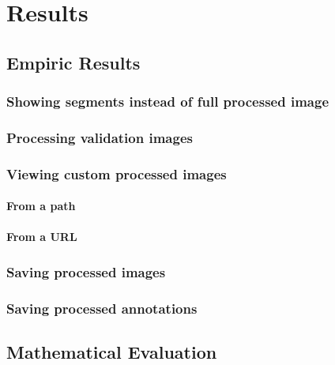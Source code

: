 \chapter{Results}

\section{Empiric Results}

\subsection{Showing segments instead of full processed image}

\subsection{Processing validation  images}

\subsection{Viewing custom processed images}

\subsubsection{From a path}

\subsubsection{From a URL}

\subsection{Saving processed images}

\subsection{Saving processed annotations}

\section{Mathematical Evaluation}

